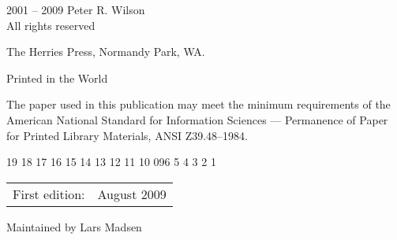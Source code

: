 \documentclass[10pt,letterpaper,extrafontsizes]{memoir}
\makeatletter
\renewcommand*{\setupparasubsecs}{%
  \let\oldnumberline\numberline%
  \renewcommand*{\cftsubsectionfont}{\itshape}%
  \renewcommand*{\cftsubsectionpagefont}{\itshape}%
  \renewcommand{\l@subsection}[2]{%
    \ifnum\c@tocdepth > 1\relax%
    \def\numberline####1{\textit{####1}~}%
    \leftskip=\cftsubsectionindent%
    \rightskip=\@tocrmarg%
     \parfillskip=\fill%
    \rightskip=3.55em plus 3fil%
    \ifhmode,\enskip \else\noindent\fi%
    {\cftsubsectionfont ##1}~{\cftsubsectionpagefont##2}%
    \let\numberline\oldnumberline%
    \ignorespaces%
    \fi}%
}
\makeatother
\begin{document}
\begingroup
\footnotesize
\setlength{\parindent}{0pt}
\setlength{\parskip}{\baselineskip}
\textcopyright{} 2001 -- 2009 Peter R. Wilson \\
All rights reserved

The Herries Press, Normandy Park, WA.

Printed in the World 

The paper used in this publication may meet the minimum requirements
of the American National Standard for Information 
Sciences --- Permanence of Paper for Printed Library Materials, 
ANSI Z39.48--1984.

\begin{center}
19 18 17 16 15 14 13 12 11 10 09\hspace{2em}6 5 4 3 2 1
\end{center}
\begin{center}
\begin{tabular}{ll}
First edition:                        & August 2009 \\
\end{tabular}
\end{center}



\bigskip

Maintained by Lars Madsen



\endgroup






\clearpage
\mbox{}

\cleardoublepage

\pagestyle{headings}


\setupshorttoc

\tableofcontents



\cleardoublepage

\setupparasubsecs

\setupmaintoc


\begingroup

%
\end{document}
